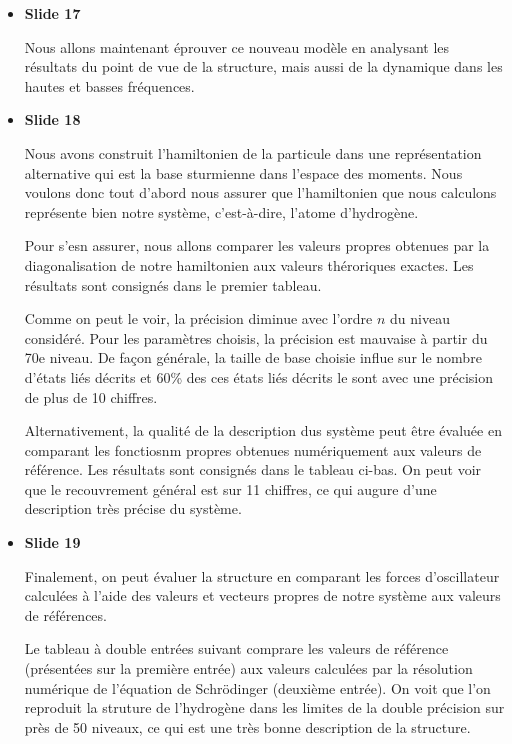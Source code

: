 \documentclass[10pt,a4paper]{article}
\begin{document}
\begin{itemize}
\section{R\'esultats}

\item \textbf{Slide 17}\par
Nous allons maintenant \'eprouver ce nouveau mod\`ele en 
analysant les r\'esultats du point de vue de la structure, 
mais aussi de la dynamique dans les hautes et basses fr\'equences.

\item \textbf{Slide 18}\par
Nous avons construit l'hamiltonien de la particule 
dans une repr\'esentation alternative qui est la base sturmienne dans 
l'espace des moments. Nous voulons donc tout d'abord nous assurer 
que l'hamiltonien que nous calculons repr\'esente bien notre syst\`eme, 
c'est-\`a-dire, l'atome d'hydrog\`ene.

Pour s'esn assurer, nous allons comparer les valeurs propres 
obtenues par la diagonalisation de notre hamiltonien aux valeurs 
th\'eroriques exactes.
Les r\'esultats sont consign\'es dans le premier tableau.

Comme on peut le voir, la pr\'ecision diminue avec l'ordre $n$
du niveau consid\'er\'e.
Pour les param\`etres choisis, la pr\'ecision est mauvaise \`a partir 
du 70e niveau.
De fa\c con g\'en\'erale, 
la taille de base choisie influe sur le nombre d'\'etats li\'es 
d\'ecrits et 60\% des ces \'etats li\'es d\'ecrits le sont avec une pr\'ecision 
de plus de 10 chiffres. 


Alternativement, la qualit\'e de la description dus syst\`eme 
peut \^etre \'evalu\'ee en comparant les fonctiosnm propres obtenues num\'eriquement 
aux valeurs de r\'ef\'erence.
Les r\'esultats sont consign\'es dans le tableau ci-bas.
On peut voir que le recouvrement g\'en\'eral est sur 11 chiffres, 
ce qui augure d'une description tr\`es pr\'ecise du syst\`eme.

\item \textbf{Slide 19}\par
Finalement, on peut \'evaluer la structure en comparant les 
forces d'oscillateur calcul\'ees \`a l'aide des valeurs et vecteurs propres 
de notre syst\`eme aux valeurs de r\'ef\'erences.

Le tableau \`a double entr\'ees suivant comprare les valeurs de 
r\'ef\'erence (pr\'esent\'ees sur la premi\`ere entr\'ee)
aux valeurs calcul\'ees par la r\'esolution num\'erique 
de l'\'equation de Schr\"odinger (deuxi\`eme entr\'ee).
On voit que l'on reproduit
la struture de l'hydrog\`ene dans les limites de la double pr\'ecision 
sur pr\`es de 50 niveaux, ce qui est une tr\`es bonne description de la structure.


\end{itemize}
\end{document}
